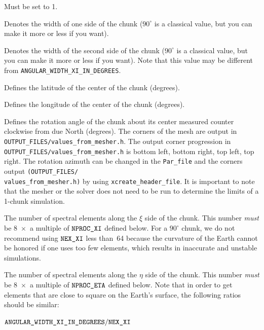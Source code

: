 \documentclass[oneside,english]{book}
\newenvironment{lyxcode}
{\begin{list}{}{
\setlength{\rightmargin}{\leftmargin}
\setlength{\listparindent}{0pt}%
\raggedright
\setlength{\itemsep}{0pt}
\setlength{\parsep}{0pt}
\normalfont\ttfamily}%
 \item[]}
{\end{list}}
\newcommand{\nexxi}{\mbox{\texttt{NEX\_XI}}}
\newcommand{\nexeta}{\mbox{\texttt{NEX\_ETA}}}
\newcommand{\nprocxi}{\mbox{\texttt{NPROC\_XI}}}
\newcommand{\nproceta}{\mbox{\texttt{NPROC\_ETA}}}
\newcommand{\nchunks}{\mbox{\texttt{NCHUNKS}}}
\begin{document}
\begin{description}
\item [{$\nchunks$}] Must be set to 1.
\item [{\texttt{ANGULAR\_WIDTH\_XI\_IN\_DEGREES}}] Denotes the width of
one side of the chunk ($90^{\circ}$ is a classical value, but you can make it more or less if you want).
\item [{\texttt{ANGULAR\_WIDTH\_ETA\_IN\_DEGREES}}] Denotes the width of
the second side of the chunk ($90^{\circ}$ is a classical value, but you can make it more or less if you want). Note that this
value may be different from \texttt{ANGULAR\_WIDTH\_XI\_IN\_DEGREES}.
\item [{\texttt{CENTER\_LATITUDE\_IN\_DEGREES}}] Defines the latitude of
the center of the chunk (degrees).
\item [{\texttt{CENTER\_LONGITUDE\_IN\_DEGREES}}] Defines the longitude
of the center of the chunk (degrees).
\item [{\texttt{GAMMA\_ROTATION\_AZIMUTH}}] Defines the rotation angle
of the chunk about its center measured counter clockwise from due
North (degrees). The corners of the mesh are output in \texttt{\small OUTPUT\_FILES/values\_from\_mesher.h}.
The output corner progression in \texttt{\small OUTPUT\_FILES/values\_from\_mesher.h}
is bottom left, bottom right, top left, top right. The rotation azimuth
can be changed in the \texttt{Par\_file} and the corners output \texttt{(}\texttt{\small OUTPUT\_FILES/}~\\
\texttt{\small values\_from\_mesher.h}\texttt{)} by using{\small{}
}\texttt{\small xcreate\_header\_file}. It is important to note that
the mesher or the solver does not need to be run to determine the
limits of a 1-chunk simulation.
\item [{$\nexxi$}] The number of spectral elements along the $\xi$ side
of the chunk. This number \textit{must} be 8~$\times$~a multiple
of $\nprocxi$ defined below. For a $90^{\circ}$ chunk, we do not
recommend using $\nexxi$ less than~64 because the curvature of the
Earth cannot be honored if one uses too few elements, which results
in inaccurate and unstable simulations.
\item [{$\nexeta$}] The number of spectral elements along the $\eta$
side of the chunk. This number \textit{must} be 8~$\times$~a multiple
of $\nproceta$ defined below. Note that in order to get elements
that are close to square on the Earth's surface, the following ratios
should be similar:

\begin{lyxcode}
$\texttt{ANGULAR\_WIDTH\_XI\_IN\_DEGREES}/\nexxi$


\end{lyxcode}
\end{description}
\end{document}
